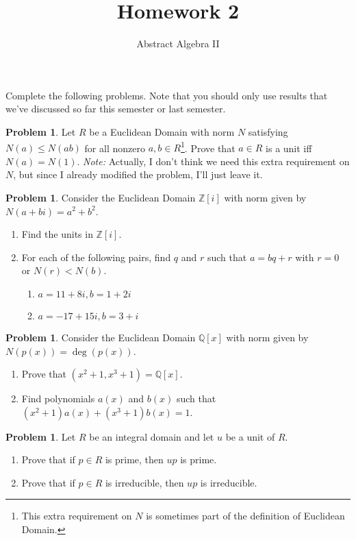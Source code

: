 \documentclass[11pt]{scrartcl}
\theoremstyle{definition}
\newtheorem{problem}[theorem]{Problem}
\begin{document}
\title{Homework 2}
\subtitle{Abstract Algebra II}
\date{}

\maketitle
\thispagestyle{fancy}

Complete the following problems. Note that you should only use results that we've discussed so far this semester or last semester.

\begin{problem}
Let $R$ be a Euclidean Domain with norm $N$ satisfying $N(a)\leq N(ab)$ for all nonzero $a,b\in R$\footnote{This extra requirement on $N$ is sometimes part of the definition of Euclidean Domain.}.  Prove that $a\in R$ is a unit iff $N(a)=N(1)$. \emph{Note:} Actually, I don't think we need this extra requirement on $N$, but since I already modified the problem, I'll just leave it.
\end{problem}

\begin{problem}
Consider the Euclidean Domain $\mathbb{Z}[i]$ with norm given by $N(a+bi)=a^2+b^2$.  
\begin{enumerate}[label=\rm{(\alph*)}]
\item Find the units in $\mathbb{Z}[i]$.
\item For each of the following pairs, find $q$ and $r$ such that $a=bq+r$ with $r=0$ or $N(r)<N(b)$.
\begin{enumerate}[label=\rm{(\roman*)}]
\item $a=11+8i,b=1+2i$
\item $a=-17+15i,b=3+i$
\end{enumerate}
\end{enumerate}
\end{problem}

\begin{problem}
Consider the Euclidean Domain $\mathbb{Q}[x]$ with norm given by $N(p(x))=\deg(p(x))$. 
\begin{enumerate}[label=\rm{(\alph*)}]
\item Prove that $(x^2+1,x^3+1)=\mathbb{Q}[x]$.
\item Find polynomials $a(x)$ and $b(x)$ such that $(x^2+1)a(x)+(x^3+1)b(x)=1$.
\end{enumerate}
\end{problem}

\begin{problem}
Let $R$ be an integral domain and let $u$ be a unit of $R$.
\begin{enumerate}[label=\rm{(\alph*)}]
\item Prove that if $p\in R$ is prime, then $up$ is prime.
\item Prove that if $p\in R$ is irreducible, then $up$ is irreducible.
\end{enumerate}
\end{problem}
\end{document}
